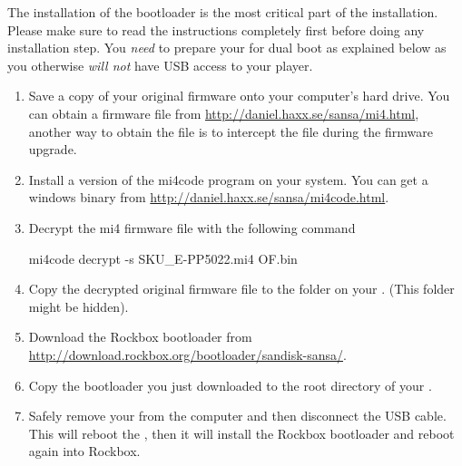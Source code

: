 
The installation of the bootloader is the most critical part of the
installation. Please make sure to read the instructions completely
first before doing any installation step. You \emph{need} to
prepare your \dap{} for dual boot as explained below as you
otherwise \emph{will not} have USB access to your player.

\begin{enumerate}
\item Save a copy of your original firmware onto your computer's hard drive.
  You can obtain a firmware file from \url{http://daniel.haxx.se/sansa/mi4.html},
  another way to obtain the file is to intercept the file during the firmware
  upgrade.
\item Install a version of the mi4code program on your system.
  You can get a windows binary from
  \url{http://daniel.haxx.se/sansa/mi4code.html}.
\item Decrypt the mi4 firmware file with the following command
  \begin{code}
    mi4code decrypt -s SKU_E-PP5022.mi4 OF.bin
  \end{code}
\item Copy the decrypted original firmware file  to the 
   folder on your \dap{}. (This folder might be hidden).
\item Download the Rockbox bootloader from 
  \url{http://download.rockbox.org/bootloader/sandisk-sansa/}.
\item Copy the bootloader you just downloaded to the root directory
  of your \dap{}.
\item Safely remove your \dap{} from the computer and then disconnect the
  USB cable. This will reboot the \dap{}, then it will install the Rockbox
  bootloader and reboot again into Rockbox.
\end{enumerate}

